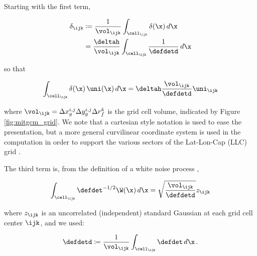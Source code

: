 \documentclass[alpha-refs]{wiley-article}
\begin{document}
Starting with the first term,
\begin{linenomath*}\begin{equation*}
    \begin{aligned}
        \delta_\ijk &\coloneqq \dfrac{1}{\vol_\ijk}\int_{\cell_\ijk}\delta(\x)\,d\x
        \\
                   &=
                   \dfrac{\deltah}{\vol_\ijk}\int_{\cell_\ijk}\dfrac{1}{\defdetd}\,d\x
    \end{aligned}
\end{equation*}\end{linenomath*}
so that
\begin{linenomath*}\begin{equation*}
    \int_{\cell_\ijk} \delta(\x)\,\uni(\x)\, d\x =
    \deltah\dfrac{\vol_\ijk}{\defdetd}\uni_\ijk
\end{equation*}\end{linenomath*}
where $\vol_\ijk = \Delta x ^{i,j}_{g} \Delta y^{i,j}_{g} \Delta r_f^k$ is the grid cell volume,
indicated by Figure \ref{fig:mitgcm_grid}.
We note that a cartesian style notation
is used to ease the presentation, but a more general curvilinear coordinate system
is used in the computation in order to support the various sectors of the
Lat-Lon-Cap (LLC) grid
\citep[see Section 2 and Appendix A of][for more details on the LLC grid]{forgetECCOv4}.

The third term is, from the definition of a white noise process
\citep{adler_random_2007},
\begin{linenomath*}\begin{equation*}
    \int_{\cell_\ijk}\defdet^{-1/2}\W(\x) \, d\x
        = \sqrt{\dfrac{\vol_\ijk}{\defdetd}} z_\ijk
\end{equation*}\end{linenomath*}
where $z_\ijk$ is an uncorrelated (independent) standard Gaussian at each grid
cell center $\ijk$, and we used:
\begin{linenomath*}\begin{equation*}
    \defdetd \coloneqq
    \dfrac{1}{\vol_\ijk}\int_{\cell_\ijk}\defdet\,d\x\,.
\end{equation*}\end{linenomath*}
\end{document}
